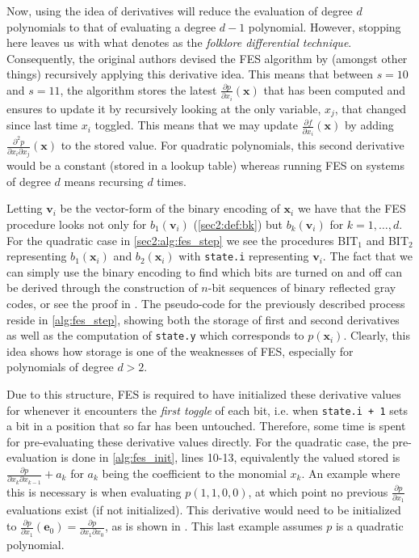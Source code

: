 Now, using the idea of derivatives will reduce the evaluation of degree $d$ polynomials to that of evaluating a degree $d-1$ polynomial. However, stopping here leaves us with what \cite{ches-2010-23990} denotes as the \textit{folklore differential technique}. Consequently, the original authors devised the FES algorithm by (amongst other things) recursively applying this derivative idea. This means that between $s = 10$ and $s = 11$, the algorithm stores the latest $\frac{\partial p}{\partial x_i}(\mathbf{x})$ that has been computed and ensures to update it by recursively looking at the only variable, $x_j$, that changed since last time $x_i$ toggled. This means that we may update $\frac{\partial f}{\partial x_i}(\mathbf{x})$ by adding $\frac{\partial^2 p}{\partial x_i \partial x_j}(\mathbf{x})$ to the stored value. For quadratic polynomials, this second derivative would be a constant (stored in a lookup table) whereas running FES on systems of degree $d$ means recursing $d$ times. 

Letting $\mathbf{v}_i$ be the vector-form of the binary encoding of $\mathbf{x}_i$ we have that the FES procedure looks not only for $b_1(\mathbf{v}_i)$ (\cref{sec2:def:bk}) but $b_k(\mathbf{v}_i)$ for $k=1,\dots,d$. For the quadratic case in \cref{sec2:alg:fes_step} we see the procedures BIT$_1$ and BIT$_2$ representing $b_1(\mathbf{x}_i)$ and $b_2(\mathbf{x}_i)$ with \texttt{state.i} representing $\mathbf{v}_i$. The fact that we can simply use the binary encoding to find which bits are turned on and off can be derived through the construction of $n$-bit sequences of binary reflected gray codes, or see the proof in \cite{tungchoumasters}. The pseudo-code for the previously described process reside in \cref{alg:fes_step}, showing both the storage of first and second derivatives as well as the computation of \texttt{state.y} which corresponds to $p(\mathbf{x}_i)$. Clearly, this idea shows how storage is one of the weaknesses of FES, especially for polynomials of degree $d > 2$. 

Due to this structure, FES is required to have initialized these derivative values for whenever it encounters the \textit{first toggle} of each bit, i.e. when \texttt{state.i + 1} sets a bit in a position that so far has been untouched. Therefore, some time is spent for pre-evaluating these derivative values directly. For the quadratic case, the pre-evaluation is done in \cref{alg:fes_init}, lines 10-13, equivalently the valued stored is $\frac{\partial p}{\partial x_k \partial x_{k-1}} + a_k$ for $a_k$ being the coefficient to the monomial $x_k$. An example where this is necessary is when evaluating $p(1,1,0,0)$, at which point no previous $\frac{\partial p}{\partial x_1}$ evaluations exist (if not initialized). This derivative would need to be initialized to $\frac{\partial p}{\partial x_1}(\mathbf{e}_0) = \frac{\partial p}{\partial x_1 \partial x_0}$, as is shown in \cite{tungchoumasters}. This last example assumes $p$ is a quadratic polynomial.

